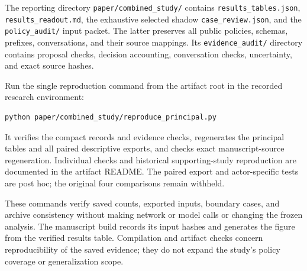 The reporting directory \texttt{paper/combined\_study/} contains
\texttt{results\_tables.json}, \texttt{results\_readout.md}, the
exhaustive selected shadow \texttt{case\_review.json}, and the
\texttt{policy\_audit/} input packet. The latter preserves all public
policies, schemas, prefixes, conversations, and their source mappings.
Its \texttt{evidence\_audit/} directory contains proposal checks,
decision accounting, conversation checks, uncertainty, and exact source
hashes.

Run the single reproduction command from the artifact root in the
recorded research environment:

\begin{verbatim}
python paper/combined_study/reproduce_principal.py
\end{verbatim}

It verifies the compact records and evidence checks, regenerates the
principal tables and all paired descriptive exports, and checks exact
manuscript-source regeneration. Individual checks and historical
supporting-study reproduction are documented in the artifact README. The
paired export and actor-specific tests are post hoc; the original four
comparisons remain withheld.

These commands verify saved counts, exported inputs, boundary cases, and
archive consistency without making network or model calls or changing
the frozen analysis. The manuscript build records its input hashes and
generates the figure from the verified results table. Compilation and
artifact checks concern reproducibility of the saved evidence; they do
not expand the study's policy coverage or generalization scope.

